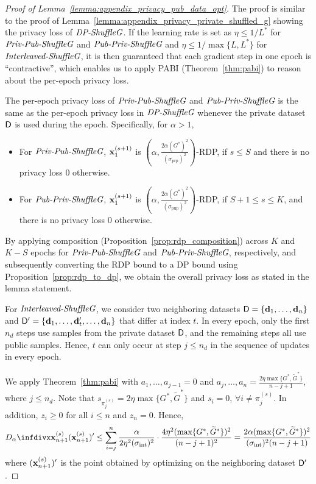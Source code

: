\begin{proof}[Proof of Lemma~\ref{lemma:appendix_privacy_pub_data_opt}]
    The proof is similar to the proof of Lemma~\ref{lemma:appendix_privacy_private_shuffled_g} showing the privacy loss of $\textit{DP-ShuffleG}$. If the learning rate is set as $\eta \leq 1/L^*$ for $\textit{Priv-Pub-ShuffleG}$ and $\textit{Pub-Priv-ShuffleG}$ and $\eta \leq 1/\max\{L, L^{*}\}$ for $\textit{Interleaved-ShuffleG}$, it is then guaranteed that each gradient step in one epoch is ``contractive'', which enables us to apply PABI (Theorem~\ref{thm:pabi}) to reason about the per-epoch privacy loss. 

    The per-epoch privacy loss of $\textit{Priv-Pub-ShuffleG}$ and $\textit{Pub-Priv-ShuffleG}$ is the same as the per-epoch privacy loss in $\textit{DP-ShuffleG}$ whenever the private dataset ${\mathsf{D}}$ is used during the epoch. Specifically, for $\alpha > 1$,
    \begin{itemize}[itemsep=0mm]
        \item For $\textit{Priv-Pub-ShuffleG}$, ${\mathbf{x}}_{1}^{(s+1)}$ is $(\alpha, \frac{2\alpha (G^*)^2}{(\sigma_{\text{prp}})^2})$-RDP, if $s \leq S$ and there is no privacy loss 0 otherwise.
        \item For $\textit{Pub-Priv-ShuffleG}$, ${\mathbf{x}}_{1}^{(s+1)}$ is $(\alpha, \frac{2\alpha (G^*)^2}{(\sigma_{\text{pup}})^2})$-RDP, if $S+1 \leq s \leq K$, and there is no privacy loss 0 otherwise.
    \end{itemize}

    By applying composition (Proposition~\ref{prop:rdp_composition}) across $K$ and $K-S$ epochs for $\textit{Priv-Pub-ShuffleG}$ and $\textit{Pub-Priv-ShuffleG}$, respectively, and subsequently converting the RDP bound to a DP bound using Proposition~\ref{prop:rdp_to_dp}, we obtain the overall privacy loss as stated in the lemma statement.

    For $\textit{Interleaved-ShuffleG}$, we consider two neighboring datasets ${\mathsf{D}} = \{{\mathbf{d}}_1,\dots, {\mathbf{d}}_n\}$ and ${\mathsf{D}}' = \{{\mathbf{d}}_1, \dots, {\mathbf{d}}_t', \dots, {\mathbf{d}}_n\}$ that differ at index $t$. 
    In every epoch, only the first $n_d$ steps use samples from the private dataset ${\mathsf{D}}$, and the remaining steps all use public samples. Hence, $t$ can only occur at step $j \leq n_d$ in the sequence of updates in every epoch. 
    
    We apply Theorem~\ref{thm:pabi} with $a_1, \dots, a_{j-1} = 0$ and $a_j,\dots, a_n = \frac{2\eta \max\{G^{*}, \widetilde{G}^{*}\}}{n-j+1}$, where $j \leq n_d$. Note that $s_{\pi_j^{(s)}} = 2\eta \max\{G^{*}, \widetilde{G}^{*}\}$ and $s_i = 0$, $\forall i\neq \pi_j^{(s)}$.  In addition, $z_i \geq 0$ for all $i\leq n$ and $z_n = 0$. Hence,
    \begin{align*}
        \infdivalpha{\rvx_{n+1}^{(s)}}{(\rvx_{n+1}^{(s)})'} \leq \sum_{i=j}^{n} \frac{\alpha}{2 \eta^2 (\sigma_{\text{int}})^2} \cdot \frac{4\eta^2 (\max\{G^{*}, \widetilde{G}^{*}\})^2}{(n-j+1)^2}
        = \frac{2\alpha (\max\{G^{*}, \widetilde{G}^{*}\})^2}{(\sigma_{\text{int}})^2(n-j+1)}
    \end{align*}
    where $({\mathbf{x}}_{n+1}^{(s)})'$ is the point obtained by optimizing on the neighboring dataset ${\mathsf{D}}'$.


\end{proof}

